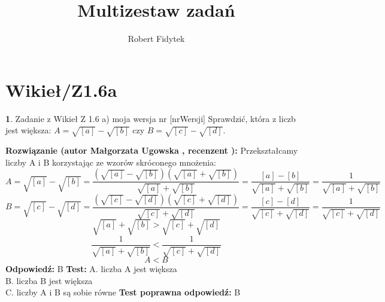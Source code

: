 \documentclass[12pt, a4paper]{article}
\title{Multizestaw zadań}
\author{Robert Fidytek}
\date{}
\theoremstyle{definition} %
\newtheorem{zad}{}
\newcommand{\kategoria}[1]{\section{#1}} %
\newcommand{\zadStart}[1]{\begin{zad}#1\newline} %
\newcommand{\zadStop}{\end{zad}}   %
\newcommand{\rozwStart}[2]{\noindent \textbf{Rozwiązanie (autor #1 , recenzent #2): }\newline} %
\newcommand{\rozwStop}{\newline}                                            %
\newcommand{\odpStart}{\noindent \textbf{Odpowiedź:}\newline}    %
\newcommand{\odpStop}{\newline}                                             %
\newcommand{\testStart}{\noindent \textbf{Test:}\newline} %
\newcommand{\testStop}{\newline} %
\newcommand{\kluczStart}{\noindent \textbf{Test poprawna odpowiedź:}\newline} %
\newcommand{\kluczStop}{\newline} %
\begin{document}
\maketitle


\kategoria{Wikieł/Z1.6a}
\zadStart{Zadanie z Wikieł Z 1.6 a) moja wersja nr [nrWersji]}
Sprawdzić, która z liczb jest większa: $A=\sqrt{[a]} -\sqrt{[b]} $ czy $B=\sqrt{[c]}-\sqrt{[d]} $.
\zadStop
\rozwStart{Małgorzata Ugowska}{}
Przekształcamy liczby A i B korzystając ze wzorów skróconego mnożenia:
$$A = \sqrt{[a]} -\sqrt{[b]} = \frac{(\sqrt{[a]} -\sqrt{[b]})(\sqrt{[a]} +\sqrt{[b]})}{\sqrt{[a]} +\sqrt{[b]}} = \frac{[a]-[b]}{\sqrt{[a]} +\sqrt{[b]}} = \frac{1}{\sqrt{[a]} +\sqrt{[b]}}$$
$$B = \sqrt{[c]} -\sqrt{[d]} = \frac{(\sqrt{[c]} -\sqrt{[d]})(\sqrt{[c]} +\sqrt{[d]})}{\sqrt{[c]} +\sqrt{[d]}} = \frac{[c]-[d]}{\sqrt{[c]} +\sqrt{[d]}} = \frac{1}{\sqrt{[c]} +\sqrt{[d]}}$$
$$\sqrt{[a]} +\sqrt{[b]}>\sqrt{[c]} +\sqrt{[d]}$$
$$\frac{1}{\sqrt{[a]} +\sqrt{[b]}}<\frac{1}{\sqrt{[c]} +\sqrt{[d]}}$$
$$A<B$$
\rozwStop
\odpStart
B
\odpStop
\testStart
A. liczba A jest większa\\
B. liczba B jest większa\\
C. liczby A i B są sobie równe
\testStop
\kluczStart
B
\kluczStop
\end{document}
